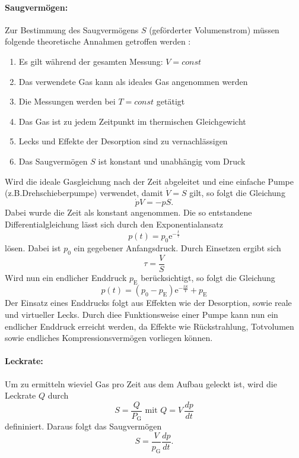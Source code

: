 \paragraph{Saugvermögen:}
 Zur Bestimmung des Saugvermögens $S$ (geförderter Volumenstrom) müssen folgende theoretische Annahmen getroffen werden \cite{anleitung}:
 \begin{enumerate}
   \item Es gilt während der gesamten Messung: $V = const$
   \item Das verwendete Gas kann als ideales Gas angenommen werden
   \item Die Messungen werden bei $T = const$ getätigt
   \item Das Gas ist zu jedem Zeitpunkt im thermischen Gleichgewicht
   \item Lecks und Effekte der Desorption sind zu vernachlässigen
   \item Das Saugvermögen $S$ ist konstant und unabhängig vom Druck
 \end{enumerate}
Wird die ideale Gasgleichung nach der Zeit abgeleitet und eine einfache Pumpe (z.B.Drehschieberpumpe) verwendet, damit $\dot{V} = S$ gilt,
so folgt die Gleichung
\begin{equation}
  \dot{p}V = -pS.
\end{equation}
Dabei wurde die Zeit als konstant angenommen.
Die so entstandene Differentialgleichung lässt sich durch den Exponentialansatz
\begin{equation}
  p(t) = p_0 \text{e}^{-\frac{t}{\tau}}
\end{equation}
lösen. Dabei ist $p_0$ ein gegebener Anfangsdruck. Durch Einsetzen ergibt sich
\begin{equation}
  \tau = \frac{V}{S}
\end{equation}
Wird nun ein endlicher Enddruck $p_\text{E}$ berücksichtigt, so folgt die Gleichung
\begin{equation}
  p(t) = (p_0 - p_\text{E})\text{e}^{-\frac{tS}{V}}+p_\text{E}
  \label{eqn:druck}
\end{equation}
Der Einsatz eines Enddrucks folgt aus Effekten wie der Desorption, sowie reale und virtueller Lecks. Durch diee Funktionsweise einer Pumpe kann nun ein
endlicher Enddruck erreicht werden, da Effekte wie Rückstrahlung, Totvolumen sowie endliches Kompressionsvermögen vorliegen können.

\paragraph{Leckrate:}
Um zu ermitteln wieviel Gas pro Zeit aus dem Aufbau geleckt ist, wird die Leckrate $Q$ durch
\begin{equation}
  S  = \frac{Q}{P_\text{G}} \text{ mit } Q = V\,\frac{dp}{dt}
\end{equation}
 defininiert. Daraus folgt das Saugvermögen
 \begin{equation}
   S = \frac{V}{p_\text{G}}\frac{dp}{dt}.
   \label{eqn:Saug}
 \end{equation}

